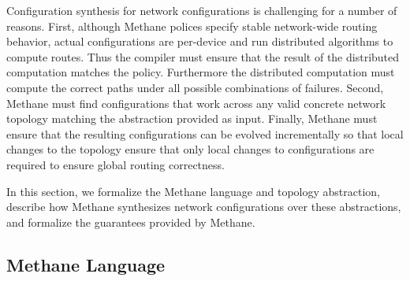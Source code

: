 \documentclass{sig-alternate-10pt}
\newcommand{\sysname}{{\small \sf Methane}\xspace}
\begin{document}
Configuration synthesis for network configurations is challenging for a number of reasons. First, although \sysname polices specify stable network-wide routing behavior, actual configurations are per-device and run distributed algorithms to compute routes. Thus the compiler must ensure that the result of the distributed computation matches the policy. Furthermore the distributed computation must compute the correct paths under all possible combinations of failures. Second, \sysname must find configurations that work across any valid concrete network topology matching the abstraction provided as input. Finally, \sysname must ensure that the resulting configurations can be evolved incrementally so that local changes to the topology ensure that only local changes to configurations are required to ensure global routing correctness. 

In this section, we formalize the \sysname language and topology abstraction, describe how \sysname synthesizes network configurations over these abstractions, and formalize the guarantees provided by \sysname.

\subsection{Methane Language}
\end{document}
